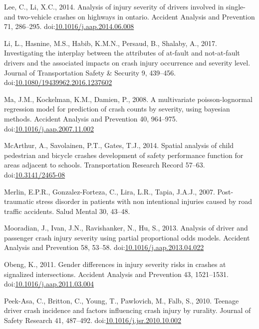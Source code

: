 \documentclass[]{elsarticle} %
\begin{document}
\leavevmode\hypertarget{ref-Lee2014analysis}{}%
Lee, C., Li, X.C., 2014. Analysis of injury severity of drivers involved
in single- and two-vehicle crashes on highways in ontario. Accident
Analysis and Prevention 71, 286--295.
doi:\href{https://doi.org/10.1016/j.aap.2014.06.008}{10.1016/j.aap.2014.06.008}

\leavevmode\hypertarget{ref-Li2017interplay}{}%
Li, L., Hasnine, M.S., Habib, K.M.N., Persaud, B., Shalaby, A., 2017.
Investigating the interplay between the attributes of at-fault and
not-at-fault drivers and the associated impacts on crash injury
occurrence and severity level. Journal of Transportation Safety \&
Security 9, 439--456.
doi:\href{https://doi.org/10.1080/19439962.2016.1237602}{10.1080/19439962.2016.1237602}

\leavevmode\hypertarget{ref-Ma2008multivariate}{}%
Ma, J.M., Kockelman, K.M., Damien, P., 2008. A multivariate
poisson-lognormal regression model for prediction of crash counts by
severity, using bayesian methods. Accident Analysis and Prevention 40,
964--975.
doi:\href{https://doi.org/10.1016/j.aap.2007.11.002}{10.1016/j.aap.2007.11.002}

\leavevmode\hypertarget{ref-McArthur2014spatial}{}%
McArthur, A., Savolainen, P.T., Gates, T.J., 2014. Spatial analysis of
child pedestrian and bicycle crashes development of safety performance
function for areas adjacent to schools. Transportation Research Record
57--63. doi:\href{https://doi.org/10.3141/2465-08}{10.3141/2465-08}

\leavevmode\hypertarget{ref-Merlin2007stress}{}%
Merlin, E.P.R., Gonzalez-Forteza, C., Lira, L.R., Tapia, J.A.J., 2007.
Post-traumatic stress disorder in patients with non intentional injuries
caused by road traffic accidents. Salud Mental 30, 43--48.

\leavevmode\hypertarget{ref-Mooradian2013analysis}{}%
Mooradian, J., Ivan, J.N., Ravishanker, N., Hu, S., 2013. Analysis of
driver and passenger crash injury severity using partial proportional
odds models. Accident Analysis and Prevention 58, 53--58.
doi:\href{https://doi.org/10.1016/j.aap.2013.04.022}{10.1016/j.aap.2013.04.022}

\leavevmode\hypertarget{ref-Obeng2011gender}{}%
Obeng, K., 2011. Gender differences in injury severity risks in crashes
at signalized intersections. Accident Analysis and Prevention 43,
1521--1531.
doi:\href{https://doi.org/10.1016/j.aap.2011.03.004}{10.1016/j.aap.2011.03.004}

\leavevmode\hypertarget{ref-Peek-Asa2010teenage}{}%
Peek-Asa, C., Britton, C., Young, T., Pawlovich, M., Falb, S., 2010.
Teenage driver crash incidence and factors influencing crash injury by
rurality. Journal of Safety Research 41, 487--492.
doi:\href{https://doi.org/10.1016/j.jsr.2010.10.002}{10.1016/j.jsr.2010.10.002}
\end{document}
